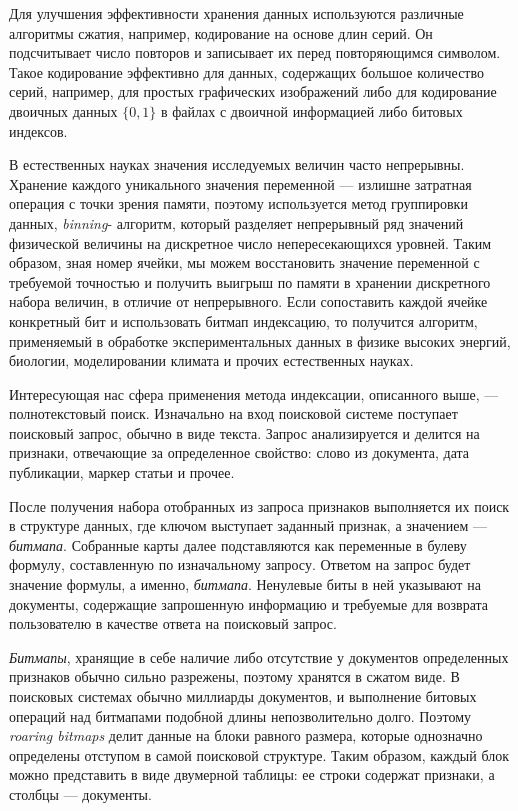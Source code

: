 Для улучшения эффективности хранения данных используются различные алгоритмы
сжатия, например, кодирование на основе длин серий. Он подсчитывает число повторов и
записывает их перед повторяющимся символом. Такое кодирование эффективно для
данных, содержащих большое количество серий, например, для простых графических
изображений либо для кодирование двоичных данных $\{0, 1\}$ в файлах с двоичной
информацией либо битовых индексов.

В естественных науках значения исследуемых величин часто непрерывны. Хранение
каждого уникального значения переменной — излишне затратная операция с точки
зрения памяти, поэтому используется метод группировки данных, \textit{binning}-
алгоритм, который разделяет непрерывный ряд значений физической величины на
дискретное число непересекающихся уровней. Таким образом, зная номер ячейки, мы
можем восстановить значение переменной с требуемой точностью и получить выигрыш
по памяти в хранении дискретного набора величин, в отличие от непрерывного.
Если сопоставить каждой ячейке конкретный бит и использовать битмап индексацию,
то получится алгоритм, применяемый в обработке экспериментальных данных в физике
высоких энергий, биологии, моделировании климата и прочих естественных науках.

Интересующая нас сфера применения метода индексации, описанного выше, —
полнотекстовый поиск. Изначально на вход поисковой системе поступает поисковый
запрос, обычно в виде текста. Запрос анализируется и делится на признаки,
отвечающие за определенное свойство: слово из документа, дата публикации, маркер
статьи и прочее.

После получения набора отобранных из запроса признаков выполняется их поиск в
структуре данных, где ключом выступает заданный признак, а значением — \textit{битмапа}.
Собранные карты далее подставляются как переменные в булеву формулу,
составленную по изначальному запросу. Ответом на запрос будет значение формулы,
а именно, \textit{битмапа}. Ненулевые биты в ней указывают на документы, содержащие
запрошенную информацию и требуемые для возврата пользователю в качестве
ответа на поисковый запрос.

\textit{Битмапы}, хранящие в себе наличие либо отсутствие у документов определенных
признаков обычно сильно разрежены, поэтому хранятся в сжатом виде. В поисковых
системах обычно миллиарды документов, и выполнение битовых операций над битмапами
подобной длины непозволительно долго. Поэтому \textit{roaring bitmaps}
\cite{Roaring:2018} делит данные на блоки равного размера, которые однозначно
определены отступом в самой поисковой структуре. Таким образом, каждый блок можно
представить в виде двумерной таблицы\label{table}: ее строки содержат признаки,
а столбцы — документы.

